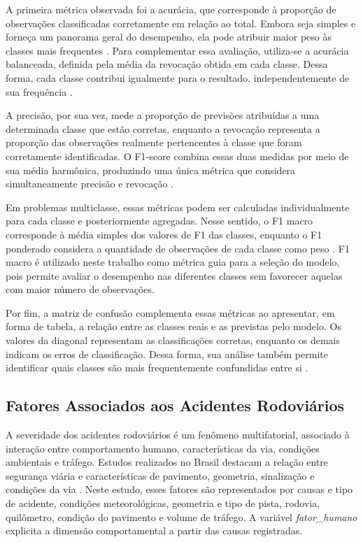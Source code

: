 \documentclass[12pt]{article}
\begin{document}
A primeira métrica observada foi a acurácia, que corresponde à proporção de observações classificadas corretamente em relação ao total. Embora seja simples e forneça um panorama geral do desempenho, ela pode atribuir maior peso às classes mais frequentes \cite{james2023islp,sklearn_metrics}. Para complementar essa avaliação, utiliza-se a acurácia balanceada, definida pela média da revocação obtida em cada classe. Dessa forma, cada classe contribui igualmente para o resultado, independentemente de sua frequência \cite{sklearn_metrics}.

A precisão, por sua vez, mede a proporção de previsões atribuídas a uma determinada classe que estão corretas, enquanto a revocação representa a proporção das observações realmente pertencentes à classe que foram corretamente identificadas. O F1-score combina essas duas medidas por meio de sua média harmônica, produzindo uma única métrica que considera simultaneamente precisão e revocação \cite{sklearn_metrics}.

Em problemas multiclasse, essas métricas podem ser calculadas individualmente para cada classe e posteriormente agregadas. Nesse sentido, o F1 macro corresponde à média simples dos valores de F1 das classes, enquanto o F1 ponderado considera a quantidade de observações de cada classe como peso \cite{sklearn_metrics}. F1 macro é utilizado neste trabalho como métrica guia para a seleção do modelo, pois permite avaliar o desempenho nas diferentes classes sem favorecer aquelas com maior número de observações.

Por fim, a matriz de confusão complementa essas métricas ao apresentar, em forma de tabela, a relação entre as classes reais e as previstas pelo modelo. Os valores da diagonal representam as classificações corretas, enquanto os demais indicam os erros de classificação. Dessa forma, sua análise também permite identificar quais classes são mais frequentemente confundidas entre si \cite{james2023islp}.

\subsection{Fatores Associados aos Acidentes Rodoviários}
A severidade dos acidentes rodoviários é um fenômeno multifatorial, associado à interação entre comportamento humano, características da via, condições ambientais e tráfego. Estudos realizados no Brasil destacam a relação entre segurança viária e características de pavimento, geometria, sinalização e condições da via \cite{carmo2019,costa2022}. Neste estudo, esses fatores são representados por causas e tipo de acidente, condições meteorológicas, geometria e tipo de pista, rodovia, quilômetro, condição do pavimento e volume de tráfego. A variável \textit{fator\_humano} explicita a dimensão comportamental a partir das causas registradas.
\end{document}
